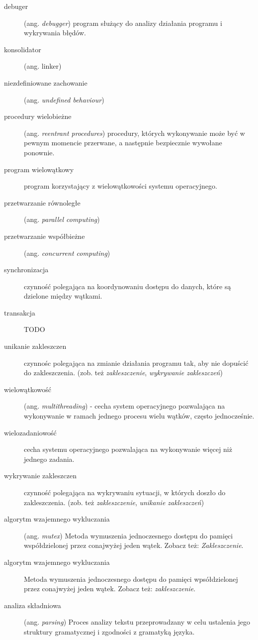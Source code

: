 \documentclass[12pt]{article}
\begin{document}
\begin{description}
	\item[debuger] (ang. \emph{debugger}) program służący do analizy działania programu i wykrywania błędów.
	\item[konsolidator] (ang. linker)
	\item[niezdefiniowane zachowanie] (ang. \emph{undefined behaviour})
	\item[procedury wielobieżne] (ang. \emph{reentrant procedures}) procedury, których wykonywanie może być w pewnym momencie przerwane, a następnie bezpiecznie wywołane ponownie.
	\item[program wielowątkowy] program korzystający z wielowątkowości systemu operacyjnego.
	\item[przetwarzanie równoległe] (ang. \emph{parallel computing})
	\item[przetwarzanie współbieżne] (ang. \emph{concurrent computing})
	\item[synchronizacja] czynność polegająca na koordynowaniu dostępu do danych, które są dzielone między wątkami.
	\item[transakcja] TODO
	\item[unikanie zakleszczen] czynnośc polegająca na zmianie działania programu tak, aby nie dopuścić do zakleszczenia. (zob. też \emph{zakleszczenie}, \emph{wykrywanie zakleszczeń})
	\item[wielowątkowość] (ang. \emph{multithreading}) - cecha system operacyjnego pozwalająca na wykonywanie w ramach jednego procesu wielu wątków, często jednocześnie.
	\item[wielozadaniowość] cecha systemu operacyjnego pozwalająca na wykonywanie więcej niż jednego zadania.
	\item[wykrywanie zakleszczen] czynność polegająca na wykrywaniu sytuacji, w których doszło do zakleszczenia. (zob. też \emph{zakleszczenie}, \emph{unikanie zakleszczeń})
    \item[algorytm wzajemnego wykluczania] (ang. \emph{mutex}) Metoda wymuszenia jednoczesnego dostępu do pamięci współdzielonej przez conajwyżej jeden wątek. Zobacz też: \emph{Zakleszczenie}.
    \item[algorytm wzajemnego wykluczania] Metoda wymuszenia jednoczesnego dostępu do pamięci wpsółdzielonej przez conajwyżej jeden wątek. Zobacz też: \emph{zakleszczenie}.
    \item[analiza składniowa] (ang. \emph{parsing}) Proces analizy tekstu przeprowadzany w celu ustalenia jego struktury gramatycznej i zgodności z gramatyką języka.

\end{description}
\end{document}

